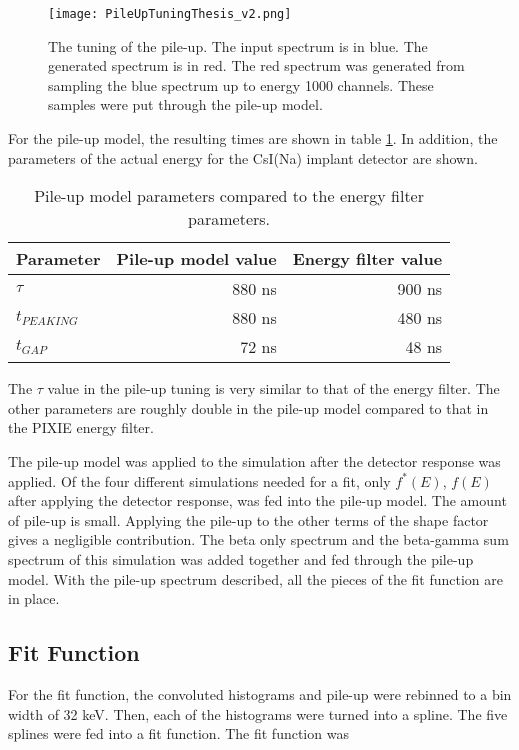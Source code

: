 \documentclass[../MaxHughesThesis.tex]{subfiles}
\begin{document}
\begin{figure}[!htb]
	\centerline{\texttt{[image: PileUpTuningThesis\_v2.png]}}
	\caption{The tuning of the pile-up.
		 The input spectrum is in blue.
		 The generated spectrum is in red.
		 The red spectrum was generated from sampling the blue spectrum up to energy 1000 channels.
		 These samples were put through the pile-up model.}
	\label{fig:pileuptune}
\end{figure}
For the pile-up model, the resulting times are shown in table \ref{tab:tunepileupmodel}.
In addition, the parameters of the actual energy for the CsI(Na) implant detector are shown.

\begin{table}[!hbt]
	\centering
	\caption{Pile-up model parameters compared to the energy filter parameters.}
		\begin{tabular}{lrr} \hline \hline 
		Parameter & Pile-up model value & Energy filter value \\ \hline
		$\tau$ & 880 ns & 900 ns \\
		$t_{PEAKING}$ & 880 ns & 480 ns \\
		$t_{GAP}$ & 72 ns & 48 ns  \\ \hline \hline 
		\end{tabular}
		\label{tab:tunepileupmodel}
\end{table}
The $\tau$ value in the pile-up tuning is very similar to that of the energy filter.
The other parameters are roughly double in the pile-up model compared to that in the PIXIE energy filter.

The pile-up model was applied to the simulation after the detector response was applied. 
Of the four different simulations needed for a fit, only $f^{*}(E)$, $f(E)$ after applying the detector response, was fed into the pile-up model.
The amount of pile-up is small. 
Applying the pile-up to the other terms of the shape factor gives a negligible contribution.
The beta only spectrum and the beta-gamma sum spectrum of this simulation was added together and fed through the pile-up model.
With the pile-up spectrum described, all the pieces of the fit function are in place.

\subsection{Fit Function}
For the fit function, the convoluted histograms and pile-up were rebinned to a bin width of 32 keV.
Then, each of the histograms were turned into a spline. 
The five splines were fed into a fit function.
The fit function was
\end{document}
